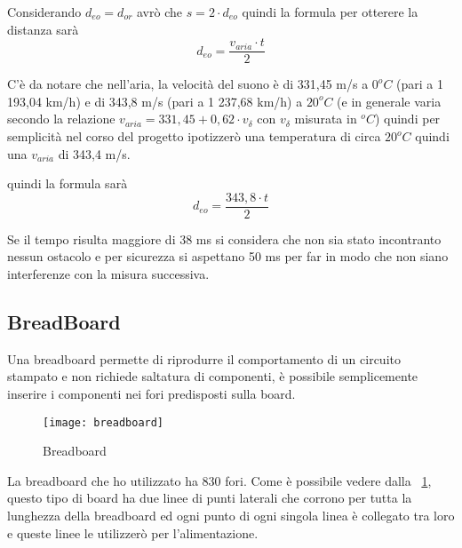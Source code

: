Considerando $d_{eo} = d_{or}$ avrò che $s=2 \cdot d_{eo}$ quindi la formula per otterere la distanza sarà 
\[d_{eo} = \dfrac{v_{aria} \cdot t}{2} \]
 

C'è da notare che nell’aria, la velocità del suono è di 331,45 m/s a $0 ^oC$ (pari a 1 193,04 km/h) e di 343,8 m/s (pari a 1 237,68 km/h) a  $20 ^oC$ (e in generale varia secondo la relazione $v_{aria} = 331,45 + 0,62 \cdot v_\delta$ con $v_\delta$ misurata in $^oC$) quindi per semplicità nel corso del progetto ipotizzerò una temperatura di circa $20 ^oC$ quindi una $v_{aria}$ di 343,4 m/s.

quindi la formula sarà
\[d_{eo} = \dfrac{343,8 \cdot t}{2}  \]
 
Se il tempo risulta maggiore di 38 ms si considera che non sia stato incontranto nessun ostacolo e per sicurezza si aspettano 50 ms per far in modo che non siano interferenze con la misura successiva.





\subsection{BreadBoard}
Una breadboard permette di riprodurre il comportamento di un circuito stampato e non richiede saltatura di componenti, è possibile semplicemente inserire i componenti nei fori predisposti sulla board.

\begin{figure}[htbp!] 
	\centering    
	\texttt{[image: breadboard]}
	\caption[Breadboard]{Breadboard}
	\label{fig:breadboard}
\end{figure}

La breadboard che ho utilizzato ha 830 fori. Come è possibile vedere dalla \figurename~\ref{fig:breadboard}, questo tipo di board ha due linee di punti laterali che corrono per tutta la lunghezza della breadboard ed ogni punto di ogni singola linea è collegato tra loro e queste linee le utilizzerò per l’alimentazione. 

